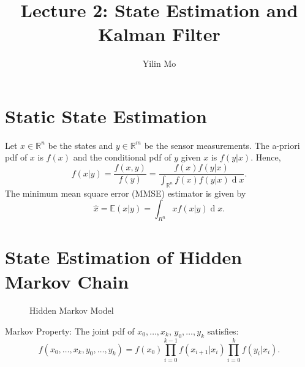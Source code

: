 \documentclass{article}
\title{Lecture 2: State Estimation and Kalman Filter}
\author{Yilin Mo}
\DeclareMathOperator{\der}{d}
\begin{document}
 \maketitle
\section{Static State Estimation}
Let $x\in \mathbb R^n$ be the states and $y\in \mathbb R^m$ be the sensor measurements. The a-priori pdf of $x$ is $f(x)$ and the conditional pdf of $y$ given $x$ is $f(y|x)$. Hence,
\begin{displaymath}
  f(x|y) =  \frac{f(x,y)}{f(y)} = \frac{f(x)f(y|x)}{\int_{\mathbb R^n} f(x)f(y|x)\der x}.
\end{displaymath}
The minimum mean square error (MMSE) estimator is given by
\begin{displaymath}
  \hat x = \mathbb E(x|y) = \int_{R^n} xf(x|y)\der x. 
\end{displaymath}
\section{State Estimation of Hidden Markov Chain}
\begin{figure}[h]
  \begin{center}
  \end{center}
  \caption{Hidden Markov Model}
\end{figure}
Markov Property: The joint pdf of $x_0,\dots,x_k$, $y_0,\dots,y_k$ satisfies:
\begin{displaymath}
  f(x_0,\dots,x_k,y_0,\dots,y_k) = f(x_0)\prod_{i=0}^{k-1}f(x_{i+1}|x_i)\prod_{i=0}^k f(y_i|x_i).
\end{displaymath}
\end{document}
